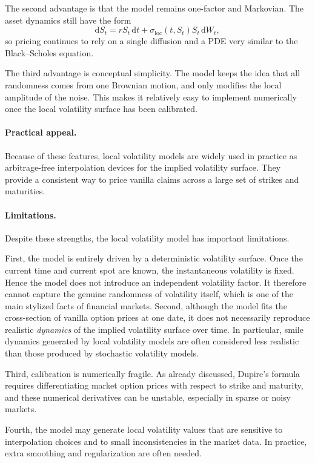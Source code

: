 \documentclass[11pt]{article}
\theoremstyle{plain}
\theoremstyle{definition}
\theoremstyle{remark}
\begin{document}
The second advantage is that the model remains one-factor and Markovian.
The asset dynamics still have the form
\[
\mathrm{d}S_t
=
rS_t\,\mathrm{d}t
+
\sigma_{\mathrm{loc}}(t,S_t)S_t\,\mathrm{d}W_t,
\]
so pricing continues to rely on a single diffusion and a PDE very
similar to the Black--Scholes equation.

The third advantage is conceptual simplicity.
The model keeps the idea that all randomness comes from one Brownian
motion, and only modifies the local amplitude of the noise.
This makes it relatively easy to implement numerically once the local
volatility surface has been calibrated.

\paragraph{Practical appeal.}
Because of these features, local volatility models are widely used in
practice as arbitrage-free interpolation devices for the implied
volatility surface.
They provide a consistent way to price vanilla claims across a large set
of strikes and maturities.

\paragraph{Limitations.}

Despite these strengths, the local volatility model has important
limitations.

First, the model is entirely driven by a deterministic volatility
surface.
Once the current time and current spot are known, the instantaneous
volatility is fixed.
Hence the model does not introduce an independent volatility factor.
It therefore cannot capture the genuine randomness of volatility itself,
which is one of the main stylized facts of financial markets.  
Second, although the model fits the cross-section of vanilla option
prices at one date, it does not necessarily reproduce realistic
\emph{dynamics} of the implied volatility surface over time.
In particular, smile dynamics generated by local volatility models are
often considered less realistic than those produced by stochastic
volatility models.

Third, calibration is numerically fragile.
As already discussed, Dupire's formula requires differentiating market
option prices with respect to strike and maturity, and these numerical
derivatives can be unstable, especially in sparse or noisy markets.  

Fourth, the model may generate local volatility values that are
sensitive to interpolation choices and to small inconsistencies in the
market data.
In practice, extra smoothing and regularization are often needed.
\end{document}
